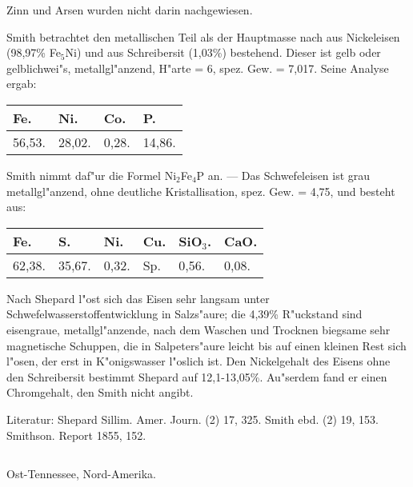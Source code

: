 \documentclass[a4paper, 11pt, oneside]{article}
\begin{document}
Zinn und Arsen wurden nicht darin nachgewiesen.

Smith betrachtet den metallischen Teil als der Hauptmasse nach aus Nickeleisen (98,97\% Fe$_{5}$Ni) und aus Schreibersit (1,03\%) bestehend. Dieser ist gelb oder gelblichwei"s, metallgl"anzend, H"arte = 6, spez. Gew. = 7,017. Seine Analyse ergab:
\begin{table}[H]
    \centering\swabfamily\Large
    \begin{tabular}{l l l l}
        Fe. & Ni. & Co. & P. \\ \hline
        56,53. & 28,02. & 0,28. & 14,86. \\
    \end{tabular}
\end{table}

Smith nimmt daf"ur die Formel Ni$_{2}$Fe$_{4}$P an. --- Das Schwefeleisen ist grau metallgl"anzend, ohne deutliche Kristallisation, spez. Gew. = 4,75, und besteht aus:
\begin{table}[H]
    \centering\swabfamily\Large
    \begin{tabular}{l l l l l l}
        Fe. & S. & Ni. & Cu. & SiO$_{3}$. & CaO. \\ \hline
        62,38. & 35,67. & 0,32. & Sp. & 0,56. & 0,08. \\
    \end{tabular}
\end{table}

Nach Shepard l"ost sich das Eisen sehr langsam unter Schwefelwasserstoffentwicklung in Salzs"aure; die 4,39\% R"uckstand sind eisengraue, metallgl"anzende, nach dem Waschen und Trocknen biegsame sehr magnetische Schuppen, die in Salpeters"aure leicht bis auf einen kleinen Rest sich l"osen, der erst in K"onigswasser l"oslich ist. Den Nickelgehalt des Eisens ohne den Schreibersit bestimmt Shepard auf 12,1-13,05\%. Au"serdem fand er einen Chromgehalt, den Smith nicht angibt.

\normalsize
Literatur: Shepard Sillim. Amer. Journ. (2) 17, 325. Smith ebd. (2) 19, 153. Smithson. Report 1855, 152.

\subsection{}
\LARGE
\paragraph{}
Ost-Tennessee, Nord-Amerika.
\end{document}
